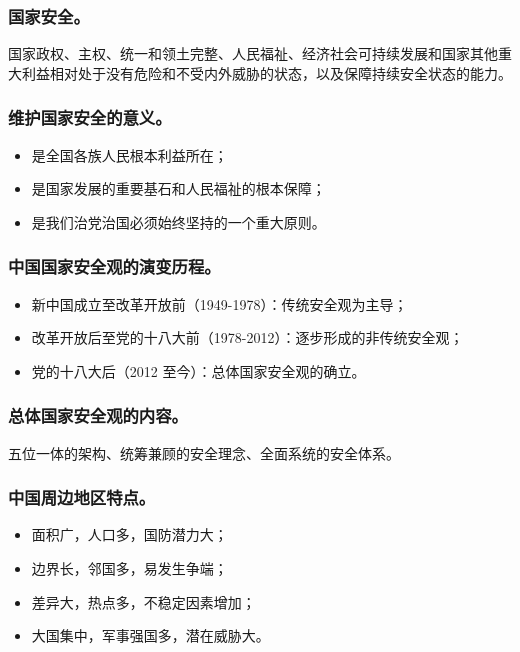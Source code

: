 \documentclass{article}
\begin{document}
\subsubsection{国家安全。}
国家政权、主权、统一和领土完整、人民福祉、经济社会可持续发展和国家其他重大利益相对处于没有危险和不受内外威胁的状态，以及保障持续安全状态的能力。

\subsubsection{维护国家安全的意义。}
\begin{itemize}
    \item 是全国各族人民根本利益所在；
    \item 是国家发展的重要基石和人民福祉的根本保障；
    \item 是我们治党治国必须始终坚持的一个重大原则。
\end{itemize}

\subsubsection{中国国家安全观的演变历程。}
\begin{itemize}
    \item 新中国成立至改革开放前（1949-1978）：传统安全观为主导；
    \item 改革开放后至党的十八大前（1978-2012）：逐步形成的非传统安全观；
    \item 党的十八大后（2012 至今）：总体国家安全观的确立。
\end{itemize}

\subsubsection{总体国家安全观的内容。}
五位一体的架构、统筹兼顾的安全理念、全面系统的安全体系。

\subsubsection{中国周边地区特点。}
\begin{itemize}
    \item 面积广，人口多，国防潜力大；
    \item 边界长，邻国多，易发生争端；
    \item 差异大，热点多，不稳定因素增加；
    \item 大国集中，军事强国多，潜在威胁大。
\end{itemize}
\end{document}
